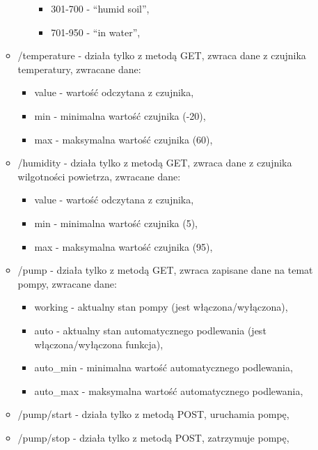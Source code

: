 \documentclass[a4paper,twoside,12pt]{book}
\begin{document}
\begin{itemize}
\begin{itemize}
\begin{itemize}
\begin{itemize}
                              \item 301-700 - ``humid soil'',
                              \item 701-950 - ``in water'',
                           \end{itemize}
                  \end{itemize}
            \item /temperature - działa tylko z metodą GET, zwraca dane z czujnika temperatury, zwracane dane:
                  \begin{itemize}
                     \item value - wartość odczytana z czujnika,
                     \item min - minimalna wartość czujnika (-20),
                     \item max - maksymalna wartość czujnika (60),
                  \end{itemize}
            \item /humidity - działa tylko z metodą GET, zwraca dane z czujnika wilgotności powietrza, zwracane dane:
                  \begin{itemize}
                     \item value - wartość odczytana z czujnika,
                     \item min - minimalna wartość czujnika (5),
                     \item max - maksymalna wartość czujnika (95),
                  \end{itemize}
            \item /pump - działa tylko z metodą GET, zwraca zapisane dane na temat pompy, zwracane dane:
                  \begin{itemize}
                     \item working - aktualny stan pompy (jest włączona/wyłączona),
                     \item auto - aktualny stan automatycznego podlewania (jest włączona/wyłączona funkcja),
                     \item auto\_min - minimalna wartość automatycznego podlewania,
                     \item auto\_max - maksymalna wartość automatycznego podlewania,
                  \end{itemize}
            \item /pump/start - działa tylko z metodą POST, uruchamia pompę,
            \item /pump/stop - działa tylko z metodą POST, zatrzymuje pompę,

\end{itemize}
\end{itemize}
\end{document}
